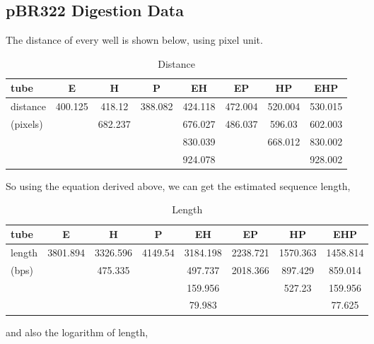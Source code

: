 \documentclass{article}
\begin{document}
        \subsection{pBR322 Digestion Data}
            The distance of every well is shown below, using pixel unit.
            \begin{table}[H]
                \caption{Distance}
                \begin{center}\begin{tabular}{|l|c|c|c|c|c|c|c|}
                    \hline
                    tube&E&H&P&EH&EP&HP&EHP\\
                    \hline
                    distance&400.125&418.12&388.082&424.118&472.004&520.004&530.015\\
                    (pixels)&&682.237&&676.027&486.037&596.03&602.003\\
                    &&&&830.039&&668.012&830.002\\
                    &&&&924.078&&&928.002\\
                    \hline
                \end{tabular}\end{center}
                \label{data.table}
            \end{table}
            So using the equation derived above, we can get the estimated sequence length,
            \begin{table}[H]
                \caption{Length}
                \begin{center}\begin{tabular}{|l|c|c|c|c|c|c|c|}
                    \hline
                    tube&E&H&P&EH&EP&HP&EHP\\
                    \hline
                    length&3801.894&3326.596&4149.54&3184.198&2238.721&1570.363&1458.814\\
                    (bps)&&475.335&&497.737&2018.366&897.429&859.014\\
                    &&&&159.956&&527.23&159.956\\
                    &&&&79.983&&&77.625\\
                    \hline
                \end{tabular}\end{center}
                \label{data.len.table}
            \end{table}
            and also the logarithm of length,
\end{document}
